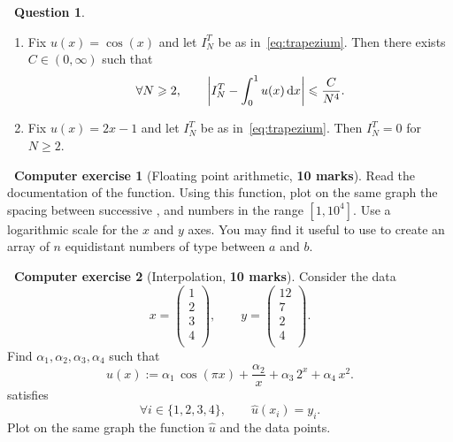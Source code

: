 \documentclass[11pt]{article}
\theoremstyle{definition}
\newtheorem{question}{{\normalfont \faGears}~Question}
\newtheorem{compexercise}{{\normalfont \faLaptop}~Computer exercise}
\renewcommand{\mymarks}[1]{\textbf{#1 marks}}
\begin{document}
\begin{question}
\begin{enumerate}
        \item
            Fix $u(x) = \cos(x)$ and let $I^T_N$ be as in~\eqref{eq:trapezium}.
            Then there exists $C \in (0, \infty)$ such that
            \[
                \forall N \geqslant 2, \qquad
                \left\lvert I^T_N - \int_{0}^1 u(x) \, \mathrm d x \right\rvert \leqslant \frac{C}{N^4}.
            \]

        \item
            Fix $u(x) = 2x - 1$ and let $I^T_N$ be as in~\eqref{eq:trapezium}.
            Then $I^T_N = 0$ for $N \geq 2$.
    \end{enumerate}
\end{question}

\newpage

\begin{compexercise}
    [Floating point arithmetic, \mymarks{10}]
    Read the documentation of the  function.
    Using this function,
    plot on the same graph the spacing between successive ,  and  numbers in the range $[1, 10^4]$.
    Use a logarithmic scale for the $x$ and $y$ axes.
    You may find it useful to use 
    to create an array of $n$ equidistant numbers of type  between $a$ and $b$.
\end{compexercise}

\begin{compexercise}
    [Interpolation, \mymarks{10}]
    Consider the data
    \[
        x =
        \begin{pmatrix}
            1 \\
            2 \\
            3 \\
            4 \\
        \end{pmatrix},
        \qquad
        y =
        \begin{pmatrix}
            12 \\
            7 \\
            2 \\
            4 \\
        \end{pmatrix}.
    \]
    Find $\alpha_1, \alpha_2, \alpha_3, \alpha_4$ such that
    \[
        \widehat u(x) := \alpha_1 \, \cos(\pi x) + \frac{\alpha_2}{x} + \alpha_3 \, 2^x + \alpha_4 \, x^2.
    \]
    satisfies
    \[
        \forall i \in \{1, 2, 3, 4\}, \qquad
        \widehat u(x_i) = y_i.
    \]
    Plot on the same graph the function $\widehat u$ and the data points.
\end{compexercise}
\end{document}
